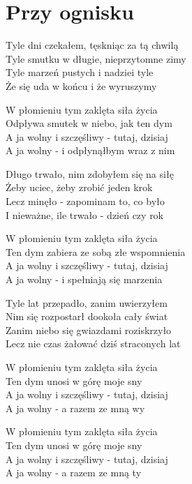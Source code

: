 \section{Przy ognisku}
\begin{text}
Tyle dni czekałem, tęskniąc za tą chwilą\\
Tyle smutku w długie, nieprzytomne zimy\\
Tyle marzeń pustych i nadziei tyle\\
Że się uda w końcu i że wyruszymy

W płomieniu tym zaklęta siła życia\\
Odpływa smutek w niebo, jak ten dym\\
A ja wolny i szczęśliwy - tutaj, dzisiaj\\
A ja wolny - i odpłynąłbym wraz z nim

Długo trwało, nim zdobyłem się na siłę\\
Żeby uciec, żeby zrobić jeden krok\\
Lecz minęło - zapominam to, co było\\
I nieważne, ile trwało - dzień czy rok

W płomieniu tym zaklęta siła życia\\
Ten dym zabiera ze sobą złe wspomnienia\\
A ja wolny i szczęśliwy - tutaj, dzisiaj\\
A ja wolny - i spełniają się marzenia

Tyle lat przepadło, zanim uwierzyłem\\
Nim się rozpostarł dookoła cały świat\\
Zanim niebo się gwiazdami roziskrzyło\\
Lecz nie czas żałować dziś straconych lat

W płomieniu tym zaklęta siła życia\\
Ten dym unosi w górę moje sny\\
A ja wolny i szczęśliwy - tutaj, dzisiaj\\
A ja wolny - a razem ze mną wy

W płomieniu tym zaklęta siła życia\\
Ten dym unosi w górę moje sny\\
A ja wolny i szczęśliwy - tutaj, dzisiaj\\
A ja wolny - a razem ze mną ty
\end{text}